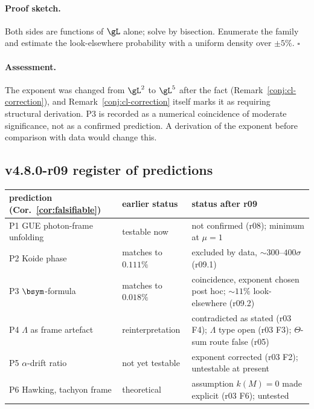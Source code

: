 \paragraph{Proof sketch.}
Both sides are functions of \(\gL\) alone; solve by bisection.  Enumerate the family and estimate the
look-elsewhere probability with a uniform density over \(\pm5\%\).  \(\square\)

\paragraph{Assessment.}
The exponent was changed from \(\gL^2\) to \(\gL^5\) after the fact (Remark~\ref{conj:cl-correction}),
and Remark~\ref{conj:cl-correction} itself marks it as requiring structural derivation.  P3 is
recorded as a numerical coincidence of moderate significance, not as a confirmed prediction.  A
derivation of the exponent before comparison with data would change this.

\subsection*{v4.8.0-r09 register of predictions}
\label{subsec:v480-r09-predictions}

\begin{center}
\small
\begin{tabular}{@{}>{\raggedright\arraybackslash}p{}>{\raggedright\arraybackslash}p{}>{\raggedright\arraybackslash}p{}@{}}
\toprule
prediction (Cor.~\ref{cor:falsifiable}) & earlier status & status after r09\\
\midrule
P1 GUE photon-frame unfolding & testable now & not confirmed (r08); minimum at \(\mu=1\)\\
P2 Koide phase & matches to \(0.111\%\) & excluded by data, \(\sim300\)--\(400\sigma\) (r09.1)\\
P3 \(\bsym\)-formula & matches to \(0.018\%\) & coincidence, exponent chosen post hoc; \(\sim11\%\) look-elsewhere (r09.2)\\
P4 \(\Lambda\) as frame artefact & reinterpretation & contradicted as stated (r03 F4); \(\Lambda\) type open (r03 F3); \(\Theta\)-sum route false (r05)\\
P5 \(\alpha\)-drift ratio & not yet testable & exponent corrected (r03 F2); untestable at present\\
P6 Hawking, tachyon frame & theoretical & assumption \(k(M)=0\) made explicit (r03 F6); untested\\
\bottomrule
\end{tabular}
\end{center}

